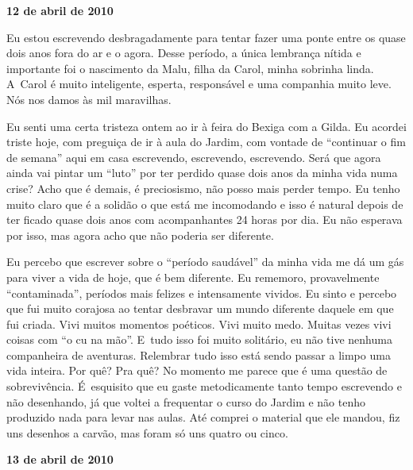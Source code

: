 \begin{center}\asterisc{}\end{center}
 \begin{flushright}\textbf{12 de abril de 2010}\end{flushright}


Eu estou escrevendo desbragadamente para tentar fazer uma ponte entre os
quase dois anos fora do ar e o agora. Desse período, a única lembrança
nítida e importante foi o nascimento da Malu, filha da Carol, minha
sobrinha linda. A~Carol é muito inteligente, esperta, responsável e uma
companhia muito leve. Nós nos damos às mil maravilhas.

Eu senti uma certa tristeza ontem ao ir à feira do Bexiga com a Gilda.
Eu acordei triste hoje, com preguiça de ir à aula do Jardim, com vontade
de ``continuar o fim de semana'' aqui em casa escrevendo, escrevendo,
escrevendo. Será que agora ainda vai pintar um ``luto'' por ter perdido
quase dois anos da minha vida numa crise? Acho que é demais, é
preciosismo, não posso mais perder tempo. Eu tenho muito claro que é a
solidão o que está me incomodando e isso é natural depois de ter ficado
quase dois anos com acompanhantes 24 horas por dia. Eu não esperava por
isso, mas agora acho que não poderia ser diferente.

Eu percebo que escrever sobre o ``período saudável'' da minha vida me dá
um gás para viver a vida de hoje, que é bem diferente. Eu rememoro,
provavelmente ``contaminada'', períodos mais felizes e intensamente
vividos. Eu sinto e percebo que fui muito corajosa ao tentar desbravar
um mundo diferente daquele em que fui criada. Vivi muitos momentos
poéticos. Vivi muito medo. Muitas vezes vivi coisas com ``o cu na mão''.
E~tudo isso foi muito solitário, eu não tive nenhuma companheira de
aventuras. Relembrar tudo isso está sendo passar a limpo uma vida
inteira. Por quê? Pra quê? No momento me parece que é uma questão de
sobrevivência. É~esquisito que eu gaste metodicamente tanto tempo
escrevendo e não desenhando, já que voltei a frequentar o curso do
Jardim e não tenho produzido nada para levar nas aulas. Até comprei o
material que ele mandou, fiz uns desenhos a carvão, mas foram só uns
quatro ou cinco.

\begin{center}\asterisc{}\end{center}
 \begin{flushright}\textbf{13 de abril de 2010}\end{flushright}


